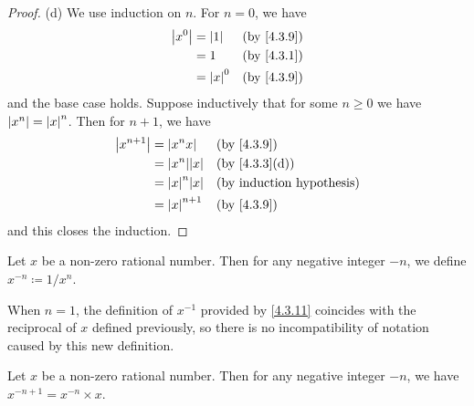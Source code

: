 \begin{proof}{(d)}
	We use induction on \(n\).
	For \(n = 0\), we have
	\begin{align*}
		\abs{x^0} & = \abs{1}   &  & \by{4.3.9} \\
		          & = 1         &  & \by{4.3.1} \\
		          & = \abs{x}^0 &  & \by{4.3.9}
	\end{align*}
	and the base case holds.
	Suppose inductively that for some \(n \geq 0\) we have \(\left\lvert x^n\right\rvert = \left\lvert x\right\rvert^n\).
	Then for \(n + 1\), we have
	\begin{align*}
		\abs{x^{n + 1}} & = \abs{x^n x}       &  & \by{4.3.9}                  \\
		                & = \abs{x^n} \abs{x} &  & \text{(by \cref{4.3.3}(d))} \\
		                & = \abs{x}^n \abs{x} &  & \byIH                       \\
		                & = \abs{x}^{n + 1}   &  & \by{4.3.9}
	\end{align*}
	and this closes the induction.
\end{proof}

\begin{defn}\label{4.3.11}
	Let \(x\) be a non-zero rational number.
	Then for any negative integer \(-n\), we define \(x^{-n} \coloneqq 1 / x^n\).
\end{defn}

\begin{note}
	When \(n = 1\), the definition of \(x^{-1}\) provided by \cref{4.3.11} coincides with the reciprocal of \(x\) defined previously, so there is no incompatibility of notation caused by this new definition.
\end{note}

\begin{ac}\label{ac:4.3.2}
	Let \(x\) be a non-zero rational number.
	Then for any negative integer \(-n\), we have \(x^{-n + 1} = x^{-n} \times x\).
\end{ac}

